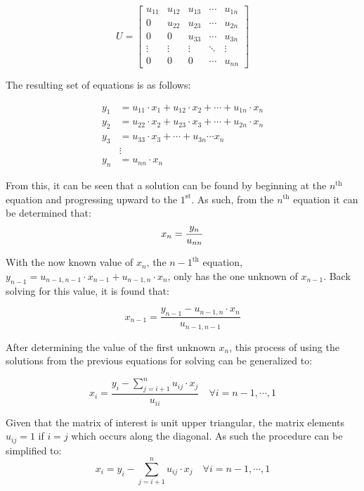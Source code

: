 \documentclass{article}
\begin{document}
\[
U =
\begin{bmatrix}
u_{11} & u_{12} & u_{13} & \cdots & u_{1n} \\
0 & u_{22} & u_{23} & \cdots & u_{2n} \\
0 & 0 & u_{33} & \cdots & u_{3n} \\
\vdots & \vdots & \vdots & \ddots & \vdots \\
0 & 0 & 0 & \cdots & u_{nn}
\end{bmatrix}
\]

\bigskip
\noindent
The resulting set of equations is as follows:

\[
\begin{aligned}
    y_{1} &= u_{11} \cdot x_{1} + u_{12} \cdot x_{2} + \cdots + u_{1n} \cdot x_{n} \\
    y_{2} &= u_{22} \cdot x_{2} + u_{23} \cdot x_{3} + \cdots + u_{2n} \cdot x_{n} \\
    y_{3} &= u_{33} \cdot x_{3} + \cdots + u_{3n} \cdots x_{n} \\
    &\vdots \\
    y_{n} &= u_{nn} \cdot x_{n}
\end{aligned}
\]

\bigskip
\noindent
From this, it can be seen that a solution can be found by beginning at the \(n^\text{th}\) equation and progressing upward to the \(1^\text{st}\). As such, from the \(n^\text{th}\) equation it can be determined that:
\[
x_{n} = \frac{y_n}{u_{nn}} \\
\]

\bigskip
\noindent
With the now known value of \(x_{n}\), the \(n-1^{\text{th}}\) equation, \(y_{n-1} = u_{n-1,n-1} \cdot x_{n-1} + u_{n-1,n} \cdot {x_n}\), only has the one unknown of \(x_{n-1}\). Back solving for this value, it is found that:

\[
x_{n-1} = \frac{y_{n-1} - u_{n-1,n} \cdot {x_n}}{u_{n-1,n-1}}
\]

\bigskip
\noindent
After determining the value of the first unknown $x_{n}$, this process of using the solutions from the previous equations for solving can be generalized to:

\[
x_{i} = \frac{y_{i} - \sum\limits_{j=i+1}^{n} u_{ij} \cdot x_{j}}{u_{ii}} \quad \forall i = n-1, \cdots, 1
\]

\bigskip 
\noindent
Given that the matrix of interest is unit upper triangular, the matrix elements $u_{ij} = 1$ if $i = j$ which occurs along the diagonal. As such the procedure can be simplified to:
\[
x_{i} = y_{i} - \sum\limits_{j=i+1}^{n} u_{ij} \cdot x_{j}\quad \forall i = n-1, \cdots, 1
\]
\end{document}
